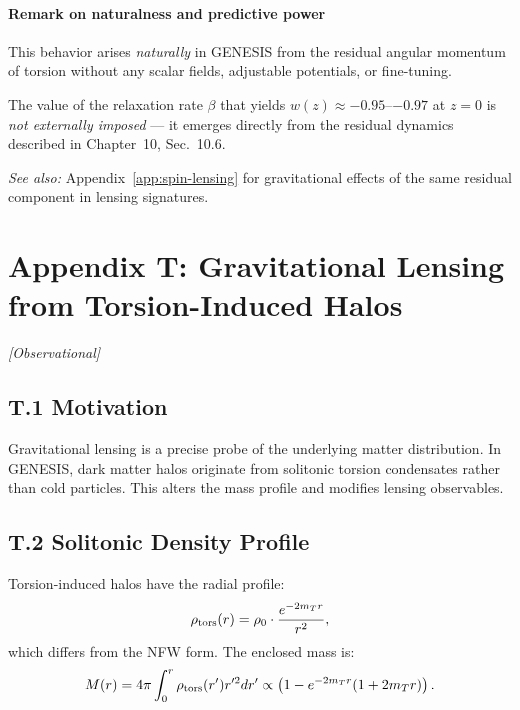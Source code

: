 \documentclass{article}
\newcommand{\obstag}{\textcolor{green!60!black}{\textit{[Observational]}}}
\begin{document}
\paragraph{Remark on naturalness and predictive power}

This behavior arises \emph{naturally} in GENESIS from the residual angular momentum 
of torsion without any scalar fields, adjustable potentials, or fine-tuning.

The value of the relaxation rate $\beta$ that yields $w(z) \approx -0.95$–$-0.97$ 
at $z = 0$ is \emph{not externally imposed} — it emerges directly from the 
residual dynamics described in Chapter~10, Sec.~10.6.

\vspace{0.5em}
\noindent\textit{See also:} Appendix~\ref{app:spin-lensing} for gravitational effects 
of the same residual component in lensing signatures.


\section*{Appendix T: Gravitational Lensing from Torsion-Induced Halos}
\label{app:spin-lensing}
\obstag


\subsection*{T.1 Motivation}
Gravitational lensing is a precise probe of the underlying matter distribution.  
In GENESIS, dark matter halos originate from solitonic torsion condensates rather than cold particles.  
This alters the mass profile and modifies lensing observables.

\subsection*{T.2 Solitonic Density Profile}
Torsion-induced halos have the radial profile:
\begin{equation}
\rho_{\rm tors}(r) = \rho_0 \cdot \frac{e^{-2 m_T r}}{r^2},
\end{equation}
which differs from the NFW form. The enclosed mass is:
\begin{equation}\label{eq:auto236}
M(r) = 4\pi \int_0^r \rho_{\rm tors}(r') r'^2 dr' \propto \left(1 - e^{-2 m_T r}(1 + 2 m_T r)\right).
\end{equation}
\end{document}
